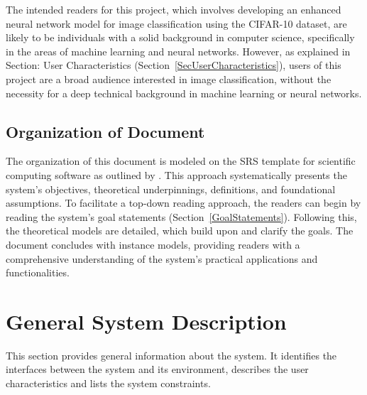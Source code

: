 \documentclass[12pt]{article}
\begin{document}
The intended readers for this project, which involves developing an enhanced neural network model for image 
classification using the CIFAR-10 dataset, are likely to be individuals with a solid background in computer science, 
specifically in the areas of machine learning and neural networks. However, as explained in Section: 
User Characteristics (Section~\ref{SecUserCharacteristics}), users of this project  are a broad audience 
interested in image classification, without the necessity for a deep technical background in machine learning or 
neural networks.

\subsection{Organization of Document}

The organization of this document is modeled on the SRS template for scientific computing software as outlined 
by \citet{SmithandLai2005}. This approach systematically presents the system's objectives, theoretical underpinnings, 
definitions, and foundational assumptions. To facilitate a top-down reading approach, the readers 
can begin by reading the system's goal statements (Section~\ref{GoalStatements}). 
Following this, the theoretical models are detailed, which build upon and clarify the goals. 
The document concludes with instance models, providing readers with a comprehensive understanding of the 
system's practical applications and functionalities.

\section{General System Description}

This section provides general information about the system.  It identifies the
interfaces between the system and its environment, describes the user
characteristics and lists the system constraints.  
\end{document}
